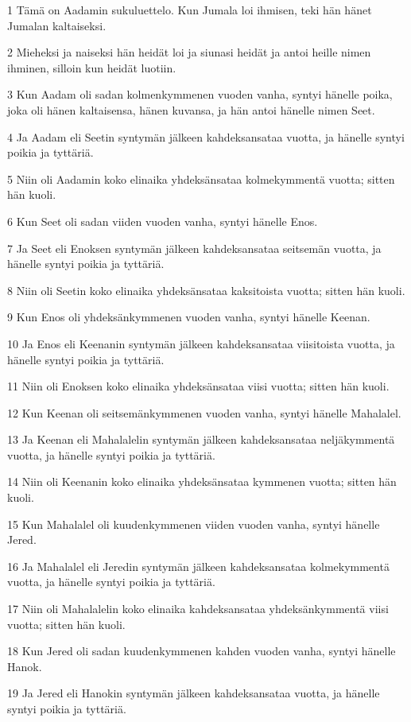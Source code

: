 \par 1 Tämä on Aadamin sukuluettelo. Kun Jumala loi ihmisen, teki hän hänet Jumalan kaltaiseksi.
\par 2 Mieheksi ja naiseksi hän heidät loi ja siunasi heidät ja antoi heille nimen ihminen, silloin kun heidät luotiin.
\par 3 Kun Aadam oli sadan kolmenkymmenen vuoden vanha, syntyi hänelle poika, joka oli hänen kaltaisensa, hänen kuvansa, ja hän antoi hänelle nimen Seet.
\par 4 Ja Aadam eli Seetin syntymän jälkeen kahdeksansataa vuotta, ja hänelle syntyi poikia ja tyttäriä.
\par 5 Niin oli Aadamin koko elinaika yhdeksänsataa kolmekymmentä vuotta; sitten hän kuoli.
\par 6 Kun Seet oli sadan viiden vuoden vanha, syntyi hänelle Enos.
\par 7 Ja Seet eli Enoksen syntymän jälkeen kahdeksansataa seitsemän vuotta, ja hänelle syntyi poikia ja tyttäriä.
\par 8 Niin oli Seetin koko elinaika yhdeksänsataa kaksitoista vuotta; sitten hän kuoli.
\par 9 Kun Enos oli yhdeksänkymmenen vuoden vanha, syntyi hänelle Keenan.
\par 10 Ja Enos eli Keenanin syntymän jälkeen kahdeksansataa viisitoista vuotta, ja hänelle syntyi poikia ja tyttäriä.
\par 11 Niin oli Enoksen koko elinaika yhdeksänsataa viisi vuotta; sitten hän kuoli.
\par 12 Kun Keenan oli seitsemänkymmenen vuoden vanha, syntyi hänelle Mahalalel.
\par 13 Ja Keenan eli Mahalalelin syntymän jälkeen kahdeksansataa neljäkymmentä vuotta, ja hänelle syntyi poikia ja tyttäriä.
\par 14 Niin oli Keenanin koko elinaika yhdeksänsataa kymmenen vuotta; sitten hän kuoli.
\par 15 Kun Mahalalel oli kuudenkymmenen viiden vuoden vanha, syntyi hänelle Jered.
\par 16 Ja Mahalalel eli Jeredin syntymän jälkeen kahdeksansataa kolmekymmentä vuotta, ja hänelle syntyi poikia ja tyttäriä.
\par 17 Niin oli Mahalalelin koko elinaika kahdeksansataa yhdeksänkymmentä viisi vuotta; sitten hän kuoli.
\par 18 Kun Jered oli sadan kuudenkymmenen kahden vuoden vanha, syntyi hänelle Hanok.
\par 19 Ja Jered eli Hanokin syntymän jälkeen kahdeksansataa vuotta, ja hänelle syntyi poikia ja tyttäriä.
